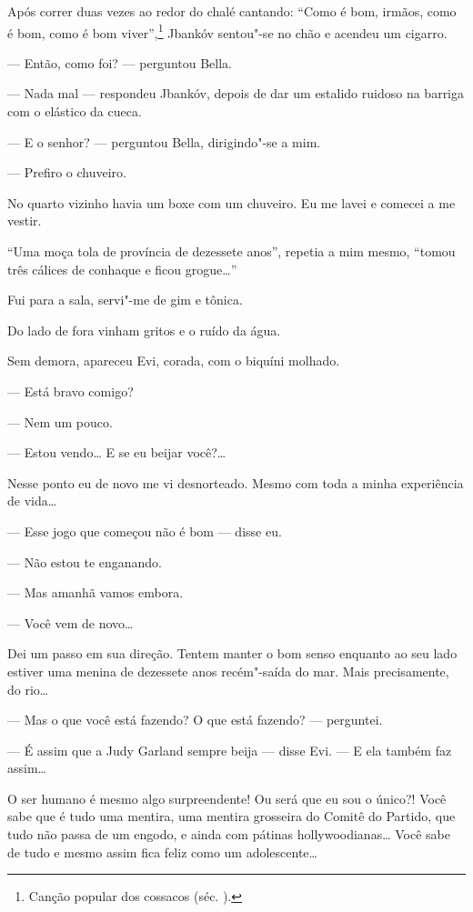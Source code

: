Após correr duas vezes ao redor do chalé cantando: ``Como é bom, irmãos,
como é bom, como é bom viver'',\footnote{Canção popular dos cossacos
  (séc. ).} Jbankóv sentou"-se no chão e acendeu um cigarro.

--- Então, como foi? --- perguntou Bella.

--- Nada mal --- respondeu Jbankóv, depois de dar um
estalido ruidoso na barriga com o elástico da cueca.

--- E o senhor? --- perguntou Bella, dirigindo"-se a mim.

--- Prefiro o chuveiro.

No quarto vizinho havia um boxe com um chuveiro. Eu me lavei e comecei a
me vestir.

``Uma moça tola de província de dezessete anos'', repetia a mim mesmo,
``tomou três cálices de conhaque e ficou grogue\ldots{}''

Fui para a sala, servi"-me de gim e tônica.

Do lado de fora vinham gritos e o ruído da água.

Sem demora, apareceu Evi, corada, com o biquíni molhado.

--- Está bravo comigo?

--- Nem um pouco.

--- Estou vendo\ldots{} E se eu beijar você?\ldots{}

Nesse ponto eu de novo me vi desnorteado. Mesmo com toda a minha
experiência de vida\ldots{}

--- Esse jogo que começou não é bom --- disse eu.

--- Não estou te enganando.

--- Mas amanhã vamos embora.

--- Você vem de novo\ldots{}

Dei um passo em sua direção. Tentem manter o bom senso enquanto ao seu
lado estiver uma menina de dezessete anos recém"-saída do mar. Mais
precisamente, do rio\ldots{}

--- Mas o que você está fazendo? O que está fazendo? ---
perguntei.

--- É assim que a Judy Garland sempre beija --- disse Evi.
--- E ela também faz assim\ldots{}

O ser humano é mesmo algo surpreendente! Ou será que eu sou o único?!
Você sabe que é tudo uma mentira, uma mentira grosseira do Comitê do
Partido, que tudo não passa de um engodo, e ainda com pátinas
hollywoodianas\ldots{} Você sabe de tudo e mesmo assim fica feliz como um
adolescente\ldots{}

